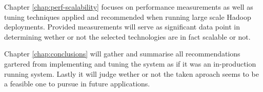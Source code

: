 Chapter \ref{chap:perf-scalability} focuses on performance measurements as well as tuning techniques applied and recommended when running large scale Hadoop deployments. Provided measurements will serve as significant data point in determining wether or not the selected technologies are in fact scalable or not.

Chapter \ref{chap:conclusions} will gather and summarise all recommendations gartered from implementing and tuning the system as if it was an in-production running system. Lastly it will judge wether or not the taken aproach seems to be a feasible one to pursue in future applications.




